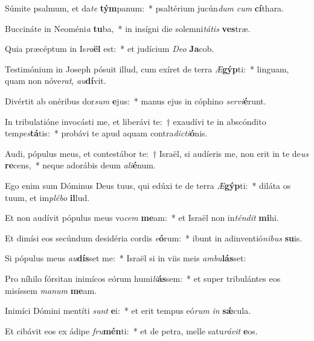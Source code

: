 \item Súmite psalmum, et da\textit{te} \textbf{tým}panum:~* psaltérium jucún\textit{dum} \textit{cum} \textbf{cí}thara.
\item Buccináte in Neoméni\textit{a} \textbf{tu}ba,~* in insígni die solemni\textit{tá}\textit{tis} \textbf{ves}træ.
\item Quia præcéptum in Is\textit{ra}\textbf{ël} est:~* et judícium \textit{De}\textit{o} \textbf{Ja}cob.
\item Testimónium in Joseph pósuit illud, cum exíret de terra \textit{Æ}\textbf{gýp}ti:~* linguam, quam non nóve\textit{rat}, \textit{au}\textbf{dí}vit.
\item Divértit ab onéribus dor\textit{sum} \textbf{e}jus:~* manus ejus in cóphino \textit{ser}\textit{vi}\textbf{é}runt.
\item In tribulatióne invocásti me, et liberávi te:~† exaudívi te in abscóndito tem\textit{pes}\textbf{tá}tis:~* probávi te apud aquam contra\textit{dic}\textit{ti}\textbf{ó}nis.
\item Audi, pópulus meus, et contestábor te:~† Israël, si audíeris me, non erit in te de\textit{us} \textbf{re}cens,~* neque adorábis deum \textit{a}\textit{li}\textbf{é}num.
\item Ego enim sum Dóminus Deus tuus, qui edúxi te de terra \textit{Æ}\textbf{gýp}ti:~* diláta os tuum, et im\textit{plé}\textit{bo} \textbf{il}lud.
\item Et non audívit pópulus meus vo\textit{cem} \textbf{me}am:~* et Israël non in\textit{tén}\textit{dit} \textbf{mi}hi.
\item Et dimísi eos secúndum desidéria cordis \textit{e}\textbf{ó}rum:~* ibunt in adinventió\textit{ni}\textit{bus} \textbf{su}is.
\item Si pópulus meus \textit{au}\textbf{dís}set me:~* Israël si in viis meis \textit{am}\textit{bu}\textbf{lás}set:
\item Pro níhilo fórsitan inimícos eórum humi\textit{li}\textbf{ás}sem:~* et super tribulántes eos misíssem \textit{ma}\textit{num} \textbf{me}am.
\item Inimíci Dómini mentíti \textit{sunt} \textbf{e}i:~* et erit tempus eó\textit{rum} \textit{in} \textbf{sǽ}cula.
\item Et cibávit eos ex ádipe \textit{fru}\textbf{mén}ti:~* et de petra, melle satu\textit{rá}\textit{vit} \textbf{e}os.
